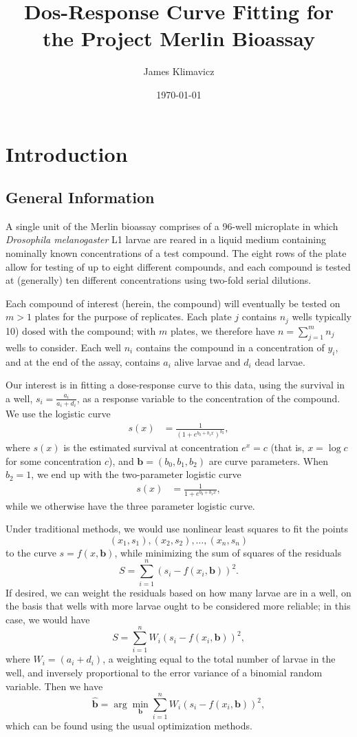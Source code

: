 \documentclass[11pt, letterpaper]{article}
\begin{document}
\title{Dos-Response Curve Fitting for the Project Merlin Bioassay}
\date{\today}
\author{James Klimavicz}
\maketitle

\section{Introduction}
\subsection{General Information}
A single unit of the Merlin bioassay comprises of a 96-well microplate in which \textit{Drosophila melanogaster} L1 larvae are reared in a liquid medium containing nominally known concentrations of a test compound. The eight rows of the plate allow for testing of up to eight different compounds, and each compound is tested at (generally) ten different concentrations using two-fold serial dilutions.

Each compound of interest (herein, the compound) will eventually be tested on $m>1$ plates for the purpose of replicates. Each plate $j$ contains $n_j$ wells typically 10) dosed with the compound; with $m$ plates, we therefore have $n = \sum_{j=1}^m n_j$ wells to consider. Each well $n_i$ contains the compound in a concentration of $y_i$, and at the end of the assay, contains $a_i$ alive larvae and $d_i$ dead larvae. 

Our interest is in fitting a dose-response curve to this data, using the survival in a well, $s_i = \frac{a_i}{a_i+d_i}$, as a response variable to the concentration of the compound. We use the logistic curve 
\begin{align*}
s(x) &= \frac{1}{\left(1+e^{b_0 + b_1x}\right)^{b_2}},
\end{align*}
where $s(x)$ is the estimated survival at concentration $e^x = c$ (that is, $x = \log c$ for some concentration $c$), and $\bm b = (b_0, b_1, b_2)$ are curve parameters. When $b_2 =1$, we end up with the two-parameter logistic curve 
\begin{align*}
s(x) &= \frac{1}{1+e^{b_0 + b_1x}},
\end{align*}
while we otherwise have the three parameter logistic curve.

Under traditional methods, we would use nonlinear least squares to fit the points $$(x_1, s_1), (x_2, s_2), \dots, (x_n, s_n)$$ to the curve $s = f(x, \bm b)$, while minimizing the sum of squares of the residuals $$S = \sum_{i=1}^n \left(s_i - f(x_i, \bm b) \right)^2.$$ If desired, we can weight the residuals based on how many larvae are in a well, on the basis that wells with more larvae ought to be considered more reliable; in this case, we would have $$S = \sum_{i=1}^n W_i\left(s_i - f(x_i, \bm b) \right)^2,$$
where $W_i = (a_i+d_i)$, a weighting equal to the total number of larvae in the well, and inversely proportional to the error variance of a binomial random variable. Then we have $$ \hat{\bm b} = \arg \min_{\bm b} \sum_{i=1}^n W_i\left(s_i - f(x_i, \bm b) \right)^2,$$ which can be found using the usual optimization methods. 
\end{document}
